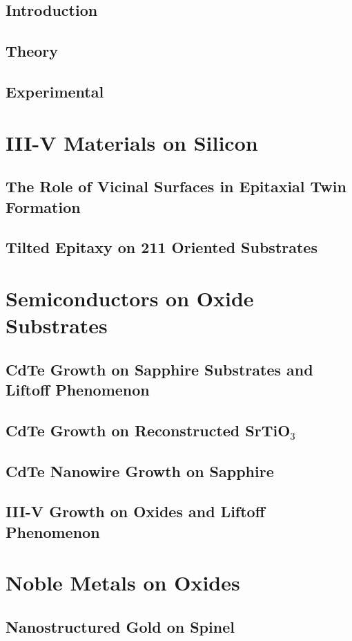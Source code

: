 \documentclass[letterpaper,10pt,twoside]{report}
\begin{document}
	\pagestyle{fancy}
	\fancyhead{}
	\fancyfoot{}
	\fancyfoot[CE,CO]{\thepage}



\chapter{Introduction}

\chapter{Theory}

\chapter{Experimental}

\part{III-V Materials on Silicon}
\chapter{The Role of Vicinal Surfaces in Epitaxial Twin Formation}

\chapter{Tilted Epitaxy on 211 Oriented Substrates}

\part{Semiconductors on Oxide Substrates}
\chapter{CdTe Growth on Sapphire Substrates and Liftoff Phenomenon}

\chapter{CdTe Growth on Reconstructed \texorpdfstring{SrTiO$_3$}{SrTiO3}}

\chapter{CdTe Nanowire Growth on Sapphire}
 
\chapter{III-V Growth on Oxides and Liftoff Phenomenon}

\part{Noble Metals on Oxides}
\chapter{Nanostructured Gold on Spinel}


\printbibliography
\end{document}
